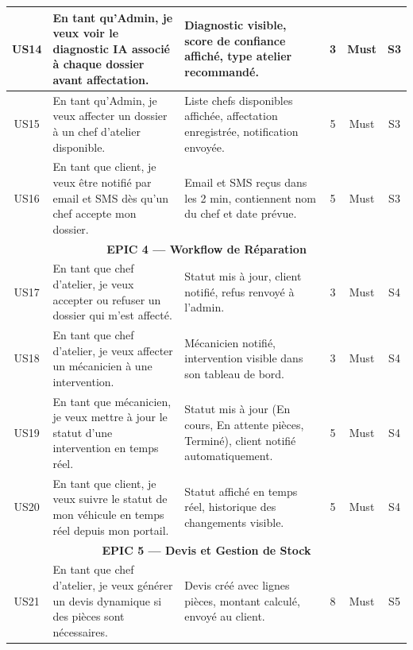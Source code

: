 \documentclass[12pt,a4paper]{report}
\begin{document}
\begin{longtable}{|c|p{4.5cm}|p{5.5cm}|c|c|c|}
US14 &
  En tant qu'Admin, je veux voir le diagnostic IA associ\'{e}
  \`{a} chaque dossier avant affectation. &
  Diagnostic visible, score de confiance affich\'{e}, type atelier
  recommand\'{e}. &
  3 & Must & S3 \\
\hline

US15 &
  En tant qu'Admin, je veux affecter un dossier \`{a} un chef
  d'atelier disponible. &
  Liste chefs disponibles affich\'{e}e, affectation enregistr\'{e}e,
  notification envoy\'{e}e. &
  5 & Must & S3 \\
\hline

US16 &
  En tant que client, je veux \^{e}tre notifi\'{e} par email et SMS
  d\`{e}s qu'un chef accepte mon dossier. &
  Email et SMS re\c{c}us dans les 2 min, contiennent nom du chef
  et date pr\'{e}vue. &
  5 & Must & S3 \\
\hline

\multicolumn{6}{|c|}{\cellcolor{primary!30}
  \textbf{EPIC 4 --- Workflow de R\'{e}paration}} \\
\hline

US17 &
  En tant que chef d'atelier, je veux accepter ou refuser un dossier
  qui m'est affect\'{e}. &
  Statut mis \`{a} jour, client notifi\'{e}, refus renvoy\'{e}
  \`{a} l'admin. &
  3 & Must & S4 \\
\hline

US18 &
  En tant que chef d'atelier, je veux affecter un m\'{e}canicien
  \`{a} une intervention. &
  M\'{e}canicien notifi\'{e}, intervention visible dans son tableau
  de bord. &
  3 & Must & S4 \\
\hline

US19 &
  En tant que m\'{e}canicien, je veux mettre \`{a} jour le statut
  d'une intervention en temps r\'{e}el. &
  Statut mis \`{a} jour (En cours, En attente pi\`{e}ces, Termin\'{e}),
  client notifi\'{e} automatiquement. &
  5 & Must & S4 \\
\hline

US20 &
  En tant que client, je veux suivre le statut de mon v\'{e}hicule
  en temps r\'{e}el depuis mon portail. &
  Statut affich\'{e} en temps r\'{e}el, historique des changements
  visible. &
  5 & Must & S4 \\
\hline

\multicolumn{6}{|c|}{\cellcolor{primary!30}
  \textbf{EPIC 5 --- Devis et Gestion de Stock}} \\
\hline

US21 &
  En tant que chef d'atelier, je veux g\'{e}n\'{e}rer un devis
  dynamique si des pi\`{e}ces sont n\'{e}cessaires. &
  Devis cr\'{e}\'{e} avec lignes pi\`{e}ces, montant calcul\'{e},
  envoy\'{e} au client. &
  8 & Must & S5 \\
\hline


\end{longtable}
\end{document}
